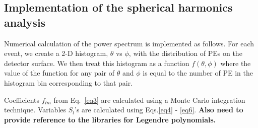 \subsection{Implementation of the spherical harmonics analysis}

Numerical calculation of the power spectrum is implemented as follows.
For each event, we create a 2-D histogram, $\theta$ vs $\phi$, with the distribution of PEs on the detector surface. We then treat this 
histogram as a function $f(\theta,\phi)$ where the value of the function for any pair of $\theta$ and $\phi$ is equal to the number of 
PE in the histogram bin corresponding to that pair.

Coefficients $f_{lm}$ from Eq.~\ref{eq3} are calculated using a Monte Carlo integration technique. Variables $S_l$'s are calculated using 
Eqs.\ref{eq4} - \ref{eq6}. {\bf Also need to provide reference to the libraries for Legendre polynomials.}


